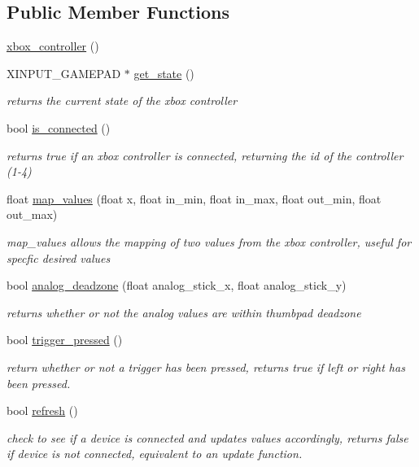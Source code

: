 \subsection*{Public Member Functions}
\begin{DoxyCompactItemize}
\item 
\hyperlink{classoctet_1_1xbox__controller_a23dae5b93d48b45fee3d992b1afed77b}{xbox\+\_\+controller} ()
\item 
X\+I\+N\+P\+U\+T\+\_\+\+G\+A\+M\+E\+P\+A\+D $\ast$ \hyperlink{classoctet_1_1xbox__controller_a3a2a6b8a5ab904bf5bbb20538a7326ce}{get\+\_\+state} ()
\begin{DoxyCompactList}\small\item\em returns the current state of the xbox controller \end{DoxyCompactList}\item 
bool \hyperlink{classoctet_1_1xbox__controller_ab6fc7aad7d4c37e56511bb87dff70459}{is\+\_\+connected} ()
\begin{DoxyCompactList}\small\item\em returns true if an xbox controller is connected, returning the id of the controller (1-\/4) \end{DoxyCompactList}\item 
float \hyperlink{classoctet_1_1xbox__controller_aaf78537caeec8411d12a39a7c2f6b90c}{map\+\_\+values} (float x, float in\+\_\+min, float in\+\_\+max, float out\+\_\+min, float out\+\_\+max)
\begin{DoxyCompactList}\small\item\em map\+\_\+values allows the mapping of two values from the xbox controller, useful for specfic desired values \end{DoxyCompactList}\item 
bool \hyperlink{classoctet_1_1xbox__controller_a418d767e949defcf6df7769bf41310ab}{analog\+\_\+deadzone} (float analog\+\_\+stick\+\_\+x, float analog\+\_\+stick\+\_\+y)
\begin{DoxyCompactList}\small\item\em returns whether or not the analog values are within thumbpad deadzone \end{DoxyCompactList}\item 
bool \hyperlink{classoctet_1_1xbox__controller_a668a207c0d9c9391efe7c39ba48c11c5}{trigger\+\_\+pressed} ()
\begin{DoxyCompactList}\small\item\em return whether or not a trigger has been pressed, returns true if left or right has been pressed. \end{DoxyCompactList}\item 
bool \hyperlink{classoctet_1_1xbox__controller_afa8298b80294785c3b320ccc6c6e51bd}{refresh} ()
\begin{DoxyCompactList}\small\item\em check to see if a device is connected and updates values accordingly, returns false if device is not connected, equivalent to an update function. \end{DoxyCompactList}\end{DoxyCompactItemize}
